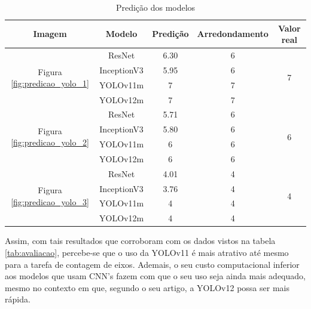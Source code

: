         \begin{table} [!htb]
            \centering
            \begin{tabular}{| c | c | c | c | c |}
            \hline
            Imagem               & Modelo      & Predição & Arredondamento & Valor real          \\
            \hline
            \multirow{4}{*}{Figura \ref{fig:predicao_yolo_1}} & ResNet      & 6.30     & 6              & \multirow{4}{*}{7}  \\
                                 & InceptionV3 & 5.95     & 6              &                     \\
                                 & YOLOv11m    & 7        & 7              &                     \\
                                 & YOLOv12m    & 7        & 7              &                     \\
            \hline
            \multirow{4}{*}{Figura \ref{fig:predicao_yolo_2}}   & ResNet      & 5.71     & 6              & \multirow{4}{*}{6}  \\
                                 & InceptionV3 & 5.80     & 6              &                     \\
                                 & YOLOv11m    & 6        & 6              &                     \\
                                 & YOLOv12m    & 6        & 6              &                     \\
            \hline
            \multirow{4}{*}{Figura \ref{fig:predicao_yolo_3}}   & ResNet      & 4.01     & 4              & \multirow{4}{*}{4}  \\
                                 & InceptionV3 & 3.76     & 4              &                     \\
                                 & YOLOv11m    & 4        & 4              &                     \\      & YOLOv12m    & 4        & 4              &                     \\                    
            \hline
            \end{tabular}
            \caption{Predição dos modelos}
            \label{tab:predicao}
        \end{table}

        Assim, com tais resultados que corroboram com os dados vistos na tabela \ref{tab:avaliacao}, percebe-se que o uso da YOLOv11 é mais atrativo até mesmo para a tarefa de contagem de eixos. Ademais, o seu custo computacional inferior aos modelos que usam CNN's fazem com que o seu uso seja ainda mais adequado, mesmo no contexto em que, segundo o seu artigo, a YOLOv12 possa ser mais rápida.
            
